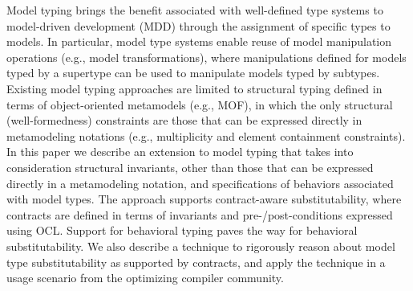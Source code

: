 Model typing brings the benefit associated with well-defined type systems to model-driven development (MDD) through the assignment of specific types to models. 
In particular, model type systems enable reuse of model manipulation operations (e.g., model transformations), where manipulations defined for models typed by a supertype can be used to manipulate models typed by subtypes. 
Existing model typing approaches are limited to structural typing defined in terms of object-oriented metamodels (e.g., MOF), in which the only structural (well-formedness) constraints are those that can be expressed directly in metamodeling notations (e.g., multiplicity and element containment constraints).
In this paper we describe an extension to model typing that takes into consideration structural invariants, other than those that can be expressed directly in a metamodeling notation, and specifications of behaviors associated with model types. 
The approach supports contract-aware substitutability, where contracts are defined in terms of invariants and pre-/post-conditions expressed using OCL. 
Support for behavioral typing paves the way for behavioral substitutability.
We also describe a technique to rigorously reason about model type substitutability as supported by contracts, and apply the technique in a usage scenario from the optimizing compiler community.


\begin{comment}
Model typing extends the applicability of typing to model-oriented type
system by assigning models with specific types. It provides support for
model substitutability addressing a wide range of facilities such as model
transformation reuse. While existing approaches are limited to
object-oriented metamodels (e.g., MOF) as types, there is a need for
exploring more precise types. In particular, we propose in this paper an
extension to model typing that takes into account contract-aware
substitutability where contracts are defined in terms of invariants and
pre-/postconditions expressed using OCL. While invariants offer a suitable
way to complete object-oriented metamodels with additional structural
properties, pre-/postconditions pave the way of behavioral
substitutability for model transformation specialization. We also provide
an implementation to rigorously reason about the substitutability on model
types with contracts and apply it on use cases coming from the optimizing
compiler community.
\end{comment}